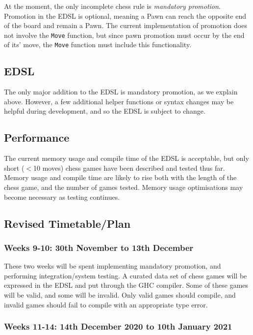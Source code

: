 \documentclass[12pt, a4paper]{scrartcl}
\begin{document}
At the moment, the only incomplete chess rule is \emph{mandatory promotion}. Promotion in the EDSL is optional, meaning a Pawn can reach the opposite end of the board and remain a Pawn. The current implementation of promotion does not involve the \lstinline{Move} function, but since pawn promotion must occur by the end of its' move, the \lstinline{Move} function must include this functionality.

\subsection{EDSL}

The only major addition to the EDSL is mandatory promotion, as we explain above. However, a few additional helper functions or syntax changes may be helpful during development, and so the EDSL is subject to change.

\subsection{Performance}

The current memory usage and compile time of the EDSL is acceptable, but only short ($<$10 moves) chess games have been described and tested thus far. Memory usage and compile time are likely to rise both with the length of the chess game, and the number of games tested. Memory usage optimisations may become necessary as testing continues.

\subsection{Revised Timetable/Plan}

\subsubsection{Weeks 9-10: 30th November to 13th December}

These two weeks will be spent implementing mandatory promotion, and performing integration/system testing. A curated data set of chess games will be expressed in the EDSL and put through the GHC compiler. Some of these games will be valid, and some will be invalid. Only valid games should compile, and invalid games should fail to compile with an appropriate type error.

\subsubsection{Weeks 11-14: 14th December 2020 to 10th January 2021}
\end{document}
